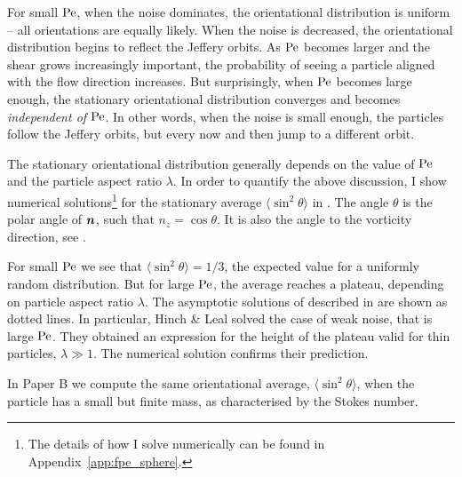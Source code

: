 \documentclass[thesis.tex]{subfiles}
\begin{document}
For small $\mbox{Pe}$, when the noise dominates, the orientational distribution is uniform -- all orientations are equally likely. When the noise is decreased, the orientational distribution begins to reflect the Jeffery orbits. As $\mbox{Pe}$ becomes larger and the shear grows increasingly important, the probability of seeing a particle aligned with the flow direction increases. 
But surprisingly, when $\mbox{Pe}$ becomes large enough, the stationary orientational distribution converges and becomes \emph{independent of} $\mbox{Pe}$. In other words, when the noise is small enough, the particles follow the Jeffery orbits, but every now and then jump to a different orbit.

The stationary orientational distribution generally depends on the value of $\mbox{Pe}$ and the particle aspect ratio $\lambda$. In order to quantify the above discussion, I show numerical solutions\footnote{The details of how I solve  numerically can be found in Appendix~\ref{app:fpe_sphere}.} for the stationary average $\langle \sin^2\theta \rangle$ in . The angle $\theta$ is the polar angle of $\mbox{\boldmath$n$}$, such that $n_z = \cos\theta$. It is also the angle to the vorticity direction, see . 

For small $\mbox{Pe}$ we see that $\langle \sin^2\theta \rangle = 1/3$, the expected value for a uniformly random distribution. But for large $\mbox{Pe}$, the average reaches a plateau, depending on particle aspect ratio $\lambda$. The asymptotic solutions of  described in \cite{brenner1974} are shown as dotted lines. In particular, Hinch \& Leal \cite{hinch1972} solved the case of weak noise, that is large $\mbox{Pe}$. They obtained an expression for the height of the plateau valid for thin particles, $\lambda\gg1$. The numerical solution confirms their prediction.

In Paper B we compute the same orientational average, $\langle \sin^2\theta \rangle$, when the particle has a small but finite mass, as characterised by the Stokes number.
\end{document}
